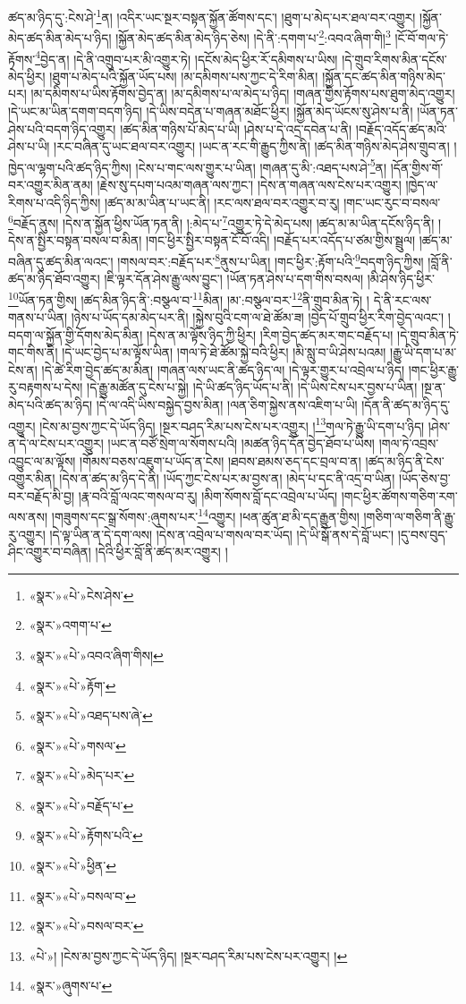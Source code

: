 ཚད་མ་ཉིད་དུ་:ངེས་ཤེ་\footnote{«སྣར་»«པེ་»ངེས་ཤེས་}ན། །འདིར་ཡང་སྔར་བསྟན་སྐྱོན་ཚོགས་དང་། །ཐུག་པ་མེད་པར་ཐལ་བར་འགྱུར། །སྐྱོན་མེད་ཚད་མིན་མེད་པ་ཉིད། །སྐྱོན་མེད་ཚད་མིན་མེད་ཉིད་ཅེས། །དེ་ནི་:དགག་པ་\footnote{«སྣར་»འགག་པ་}:འབའ་ཞིག་གི།\footnote{«སྣར་»«པེ་»འབའ་ཞིག་གིས།} །ངོ་བོ་གལ་ཏེ་རྟོགས་\footnote{«སྣར་»«པེ་»རྟོག་}བྱེད་ན། །དེ་ནི་འགྲུབ་པར་མི་འགྱུར་ཏེ། །དངོས་མེད་ཕྱིར་རོ་དམིགས་པ་ཡིས། །དེ་གྲུབ་རིགས་མིན་དངོས་མེད་ཕྱིར། །ཐུག་པ་མེད་པའི་སྐྱོན་ཡོད་པས། །མ་དམིགས་པས་ཀྱང་དེ་རིག་མིན། །སྐྱོན་དང་ཚད་མིན་གཉིས་མེད་པར། །མ་དམིགས་པ་ཡིས་རྟོགས་བྱེད་ན། །མ་དམིགས་པ་ལ་མེད་པ་ཉིད། །གཞན་གྱིས་རྟོགས་པས་ཐུག་མེད་འགྱུར། །དེ་ཡང་མ་ཡིན་དགག་བདག་ཉིད། །དེ་ཡིས་བདེན་པ་གཞན་མཐོང་ཕྱིར། །སྐྱོན་མེད་ཡོངས་སུ་ཤེས་པ་ནི། །ཡོན་ཏན་ཤེས་པའི་བདག་ཉིད་འགྱུར། །ཚད་མིན་གཉིས་པོ་མེད་པ་ཡི། །ཤེས་པ་དེ་འདྲ་དབེན་པ་ནི། །བརྗོད་འདོད་ཚད་མའི་ཤེས་པ་ཡི། །རང་བཞིན་དུ་ཡང་ཐལ་བར་འགྱུར། །ཡང་ན་རང་གི་རྒྱུད་ཀྱིས་ནི། །ཚད་མིན་གཉིས་མེད་ཤེས་གྲུབ་ན། །ཁྱེད་ལ་ལྷག་པའི་ཚད་ཉིད་ཀྱིས། །ངེས་པ་གང་ལས་གྱུར་པ་ཡིན། །གཞན་དུ་མི་:འཐད་པས་ཤེ་\footnote{«སྣར་»«པེ་»འཐད་པས་ཞེ་}ན། །དོན་གྱིས་གོ་བར་འགྱུར་མིན་ནམ། །རྗེས་སུ་དཔག་པའམ་གཞན་ལས་ཀྱང་། །དེས་ན་གཞན་ལས་ངེས་པར་འགྱུར། །ཁྱེད་ལ་རིགས་པ་འདི་ཉིད་ཀྱིས། །ཚད་མ་མ་ཡིན་པ་ཡང་ནི། །རང་ལས་ཐལ་བར་འགྱུར་བ་རུ། །གང་ཡང་རུང་བ་བསལ་\footnote{«སྣར་»«པེ་»གསལ་}བརྗོད་ནུས། །དེས་ན་སྐྱོན་ཕྱིས་ཡོན་ཏན་ནི། །:མེད་པ་\footnote{«སྣར་»«པེ་»མེད་པར་}འགྱུར་ཏེ་དེ་མེད་པས། །ཚད་མ་མ་ཡིན་དངོས་ཉིད་ནི། །དེས་ན་སྤྱིར་བསྟན་བསལ་བ་མིན། །གང་ཕྱིར་སྤྱིར་བསྟན་ངོ་བོ་འདི། །བརྗོད་པར་འདོད་པ་ཙམ་གྱིས་སྦྲུལ། །ཚད་མ་བཞིན་དུ་ཚད་མིན་ལའང་། །གསལ་བར་:བརྗོད་པར་\footnote{«སྣར་»«པེ་»བརྗོད་པ་}ནུས་པ་ཡིན། །གང་ཕྱིར་:རྟོག་པའི་\footnote{«སྣར་»«པེ་»རྟོགས་པའི་}བདག་ཉིད་ཀྱིས། །བློ་ནི་ཚད་མ་ཉིད་ཐོབ་འགྱུར། །ཇི་ལྟར་དོན་ཤེས་རྒྱུ་ལས་བྱུང་། །ཡོན་ཏན་ཤེས་པ་དག་གིས་བསལ། །མི་ཤེས་ཉིད་ཕྱིར་\footnote{«སྣར་»«པེ་»ཕྱིན་}ཡོན་ཏན་གྱིས། །ཚད་མིན་ཉིད་ནི་:བསྩལ་བ་\footnote{«སྣར་»«པེ་»བསལ་བ་}མིན། །མ་:བསྩལ་བར་\footnote{«སྣར་»«པེ་»བསལ་བར་}ནི་གྲུབ་མིན་ཏེ། །
དེ་ནི་རང་ལས་གནས་པ་ཡིན། །ཉེས་པ་ཡོད་དམ་མེད་པར་ནི། །སྐྱེས་བུའི་ངག་ལ་ཐེ་ཚོམ་ཟ། །བྱེད་པོ་གྲུབ་ཕྱིར་རིག་བྱེད་ལའང་། །བདག་ལ་སྐྱོན་གྱི་དོགས་མེད་མིན། །དེས་ན་མ་ལྟོས་ཉིད་ཀྱི་ཕྱིར། །རིག་བྱེད་ཚད་མར་གང་བརྗོད་པ། །དེ་གྲུབ་མིན་ཏེ་གང་གིས་ནི། །དེ་ཡང་བྱེད་པ་མ་ལྟོས་ཡིན། །གལ་ཏེ་ཐེ་ཚོམ་སྐྱེ་བའི་ཕྱིར། །མི་སླུ་བ་ཡི་ཤེས་པའམ། །རྒྱུ་ཡི་དག་པ་མ་ངེས་ན། །དེ་ཚེ་རིག་བྱེད་ཚད་མ་མིན། །གཞན་ལས་ཡང་ནི་ཚད་ཉིད་ལ། །དེ་ལྟར་གྱུར་པ་འབྲེལ་པ་ཉིད། །གང་ཕྱིར་རྒྱུ་རུ་བརྟགས་པ་དེས། །དེ་རྒྱུ་མཚོན་དུ་ངེས་པ་སྐྱེ། །དེ་ཡི་ཚད་ཉིད་ཡོད་པ་ནི། །དེ་ཡིས་ངེས་པར་བྱས་པ་ཡིན། །སྔ་ན་མེད་པའི་ཚད་མ་ཉིད། །དེ་ལ་འདི་ཡིས་བསྐྱེད་བྱས་མིན། །ལན་ཅིག་སྐྱེས་ནས་འཇིག་པ་ཡི། །དོན་ནི་ཚད་མ་ཉིད་དུ་འགྱུར། །ངེས་མ་བྱས་ཀྱང་དེ་ཡོད་ཉིད། །སྔར་བཤད་རིམ་པས་ངེས་པར་འགྱུར། །\footnote{«པེ་»། །ངེས་མ་བྱས་ཀྱང་དེ་ཡོད་ཉིད། །སྔར་བཤད་རིམ་པས་ངེས་པར་འགྱུར། །}གལ་ཏེ་རྒྱུ་ཡི་དག་པ་ཉིད། །ཤེས་ན་དེ་ལ་ངེས་པར་འགྱུར། །ཡང་ན་བཙོ་སྲེག་ལ་སོགས་པའི། །མཚན་ཉིད་དོན་བྱེད་ཐོབ་པ་ཡིས། །གལ་ཏེ་འབྲས་འབྱུང་ལ་མ་ལྟོས། །གོམས་བཅས་འཇུག་པ་ཡོད་ན་ངེས། །ཐབས་ཐམས་ཅད་དང་བྲལ་བ་ན། །ཚད་མ་ཉིད་ནི་ངེས་འགྱུར་མིན། །དེས་ན་ཚད་མ་ཉིད་དེ་ནི། །ཡོད་ཀྱང་ངེས་པར་མ་བྱས་ན། །མེད་པ་དང་ནི་འདྲ་བ་ཡིན། །ཡོད་ཅེས་བྱ་བར་བརྗོད་མི་བྱ། །རྣ་བའི་བློ་ལའང་གསལ་བ་རུ། །མིག་སོགས་བློ་དང་འབྲེལ་པ་ཡོད། །གང་ཕྱིར་ཚོགས་གཅིག་རག་ལས་ནས། །གཟུགས་དང་སྒྲ་སོགས་:ཞུགས་པར་\footnote{«སྣར་»ཞུགས་པ་}འགྱུར། །ཕན་ཚུན་ཐ་མི་དད་རྒྱུན་གྱིས། །གཅིག་ལ་གཅིག་ནི་རྒྱུ་རུ་འགྱུར། །དེ་ལྟ་ཡིན་ན་དེ་དག་ལས། །དེས་ན་འབྲེལ་པ་གསལ་བར་ཡོད། །དེ་ཡི་སྒོ་ནས་དེ་བློ་ཡང་། །དུ་བས་བུད་ཤིང་འགྱུར་བ་བཞིན། །དེའི་ཕྱིར་བློ་ནི་ཚད་མར་འགྱུར། །
